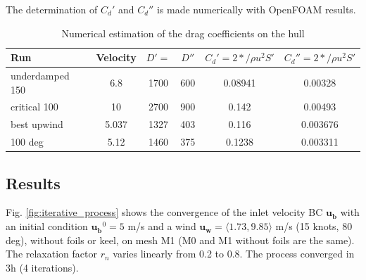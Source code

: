     The determination of $C_d'$ and $C_d''$ is made numerically with OpenFOAM results. 

    \begin{table}[ht!]
        \centering
        \begin{tabular}{p{4cm}|c|c|c|c|c}
            Run & Velocity & $D'=$ & $D''$ & $C_d'=2*/\rho u^2 S'$ & $C_d''=2*/\rho u^2 S'$ \\
            \hline  
            underdamped 150 & 6.8 & 1700 & 600 & 0.08941 & 0.00328 \\
            critical 100 & 10 & 2700 & 900 & 0.142 & 0.00493 \\
            best upwind & 5.037 & 1327 & 403 & 0.116 & 0.003676 \\  
            100 deg & 5.12 & 1460 & 375 & 0.1238 & 0.003311 \\
        \end{tabular}
        \caption{Numerical estimation of the drag coefficients on the hull}
        \label{tab:dragCoeffHull}
    \end{table}


\clearpage
\subsection{Results}
    Fig. \ref{fig:iterative_process} shows the convergence of the inlet velocity BC $\mathbf{u_b}$ with an initial condition $\mathbf{u_b}^0 = 5$ m/s and a wind $\mathbf{u_w} = \langle 1.73, 9.85\rangle$ m/s (15 knots, 80 deg), without foils or keel, on mesh M1 (M0 and M1 without foils are the same). The relaxation factor $r_n$ varies linearly from 0.2 to 0.8. The process converged in 3h (4 iterations). 

